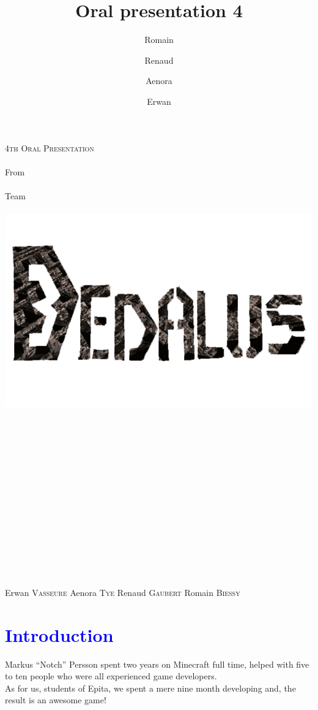 \documentclass[article]{report}         %
\title {Oral presentation 4}
\author {Romain\and Renaud\and Aenora\and Erwan}
\date {}
\begin{document}
  \thispagestyle{empty}
    \begin{titlepage} 
    \vspace*{1cm} 
      \begin{center} 
        {\huge{\textsc{4th Oral Presentation} \\ ~ \\{\large From}\\ ~\\ Team \\  ~ \\ }}
        \includegraphics[width = 14cm]{images/Titles/Dedalus.png}
      \\ ~ \\ ~ \\ ~ \\ ~ \\ ~ \\ ~ \\ ~ \\ ~ \\ ~ \\ ~ \\ ~ \\ ~ \\ ~ \\ ~ 
    \end{center}
      \hfill {\large Erwan  \textsc{Vasseure}}
      \hfill {\large Aenora \textsc{Tye}}
      \hfill {\large Renaud \textsc{Gaubert}}
      \hfill {\large Romain \textsc{Biessy}}
    \end{titlepage} 

    \tableofcontents
      \setcounter{page}{2}
      \newpage
    \chapter{\textcolor{blue}{Introduction}}
      Markus ``Notch'' Persson spent two years on Minecraft full time, helped with five to ten people who were all experienced game developers. \\
      As for us, students of Epita, we spent a mere nine month developing and, the result is an awesome game!\\
\end{document}
